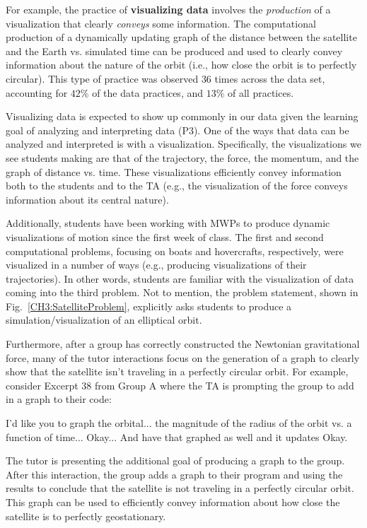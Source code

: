 \documentclass{msuphddissertation}
\begin{document}
\begin{doublespace}
For example, the practice of \textbf{visualizing data} involves the \textit{production} of a visualization that clearly \textit{conveys} some information.  The computational production of a dynamically updating graph of the distance between the satellite and the Earth vs. simulated time can be produced and used to clearly convey information about the nature of the orbit (i.e., how close the orbit is to perfectly circular).  This type of practice was observed $36$ times across the data set, accounting for $42\%$ of the data practices, and $13\%$ of all practices.

Visualizing data is expected to show up commonly in our data given the learning goal of analyzing and interpreting data (P3).  One of the ways that data can be analyzed and interpreted is with a visualization.  Specifically, the visualizations we see students making are that of the trajectory, the force, the momentum, and the graph of distance vs. time.  These visualizations efficiently convey information both to the students and to the TA (e.g., the visualization of the force conveys information about its central nature).

Additionally, students have been working with MWPs to produce dynamic visualizations of motion since the first week of class.  The first and second computational problems, focusing on boats and hovercrafts, respectively, were visualized in a number of ways (e.g., producing visualizations of their trajectories).  In other words, students are familiar with the visualization of data coming into the third problem.  Not to mention, the problem statement, shown in Fig.~\ref{CH3:SatelliteProblem}, explicitly asks students to produce a simulation/visualization of an elliptical orbit. 

Furthermore, after a group has correctly constructed the Newtonian gravitational force, many of the tutor interactions focus on the generation of a graph to clearly show that the satellite isn't traveling in a perfectly circular orbit.  For example, consider Excerpt 38 from Group A where the TA is prompting the group to add in a graph to their code: \begin{description}
\TA I'd like you to graph the orbital... the magnitude of the radius of the orbit vs. a function of time...
\SC Okay...
\TA And have that graphed as well and it updates
\SC Okay.
\end{description}  The tutor is presenting the additional goal of producing a graph to the group.  After this interaction, the group adds a graph to their program and using the results to conclude that the satellite is not traveling in a perfectly circular orbit.  This graph can be used to efficiently convey information about how close the satellite is to perfectly geostationary.  


\end{doublespace}
\end{document}
